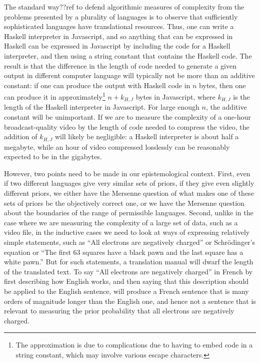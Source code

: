 The standard way??ref to defend algorithmic measures of complexity from the problems presented by a plurality of languages
is to observe that sufficiently sophisticated languages have translational resources. Thus, one can write a Haskell interpreter
in Javascript, and so anything that can be expressed in Haskell can be expressed in Javascript by including the code for a Haskell interpreter, 
and then using a string constant that contains the Haskell code. The result is that the difference in the length of code needed to
generate a given output in different computer language will typically not be more than an additive constant: if one can
produce the output with Haskell code in $n$ bytes, then one can produce it in approximately\footnote{The approximation is due
to complications due to having to embed code in a string constant, which may involve various escape characters.} $n+k_{H,J}$ 
bytes in Javascript, where $k_{H,J}$ is the length of the Haskell interpreter in Javascript. For large enough $n$, the additive constant will be
unimportant. If we are to measure the complexity of a one-hour broadcast-quality video by the length of code needed to compress 
the  video, the addition of $k_{H,J}$ will likely be negligible: a Haskell interpreter is about half a megabyte, while 
an hour of video compressed losslessly can be reasonably expected to be in the gigabytes.

However, two points need to be made in our epistemological context. First, even if two different languages give very similar sets of priors, 
if they give even slightly different priors, we either have the Mersenne question of what makes one of these sets of priors be the 
objectively correct one, or we have the Mersenne question about the boundaries of the range of permissible languages. Second,
unlike in the case where we are measuring the complexity of a large set of data, such as a video file, in the inductive cases we 
need to look at ways of expressing relatively simple statements, such as ``All electrons are negatively charged'' or 
Schr\"odinger's equation or ``The first 63 squares have a black pawn and the last square has a white pawn.'' But for such statements, 
a translation manual will dwarf the length of the translated text. To say ``All electrons are negatively charged'' in French by first describing how English works, and then saying that this
description should be applied to the English sentence, will produce a French sentence that is many orders of magnitude longer
than the English one, and hence not a sentence that is relevant to measuring the prior probability that all electrons are negatively
charged.

